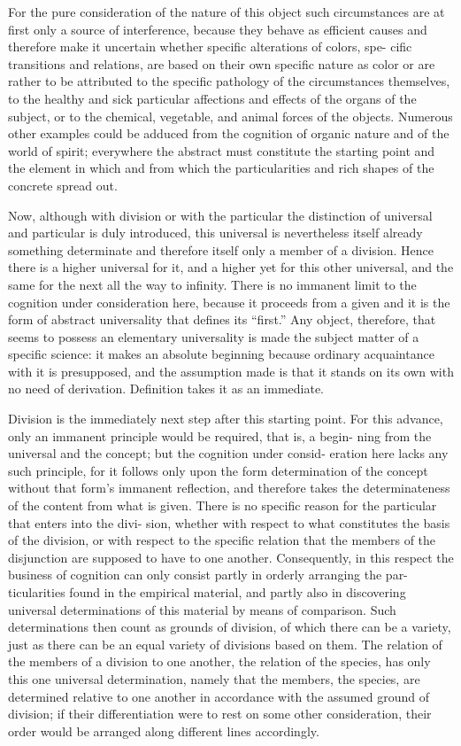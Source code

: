 For the pure consideration of the nature of this object such circumstances are
at first only a source of interference, because they behave as efficient causes
and therefore make it uncertain whether specific alterations of colors, spe-
cific transitions and relations, are based on their own specific nature as color
or are rather to be attributed to the specific pathology of the circumstances
themselves,
 to the healthy and sick particular affections and effects of the
organs of the subject,
or to the chemical, vegetable,
and animal forces of the objects.
Numerous other examples could be adduced from the cognition
of organic nature and of the world of spirit; everywhere the abstract must
constitute the starting point and the element in which and from which the
particularities and rich shapes of the concrete spread out.

Now, although with division or with the particular the distinction of
universal and particular is duly introduced, this universal is nevertheless
itself already something determinate and therefore itself only a member
of a division. Hence there is a higher universal for it, and a higher yet
for this other universal, and the same for the next all the way to infinity.
There is no immanent limit to the cognition under consideration here,
because it proceeds from a given and it is the form of abstract universality
that defines its “first.” Any object, therefore, that seems to possess an
elementary universality is made the subject matter of a specific science:
it makes an absolute beginning because ordinary acquaintance with it is
presupposed, and the assumption made is that it stands on its own with no
need of derivation. Definition takes it as an immediate.

Division is the immediately next step after this starting point. For this
advance, only an immanent principle would be required, that is, a begin-
ning from the universal and the concept; but the cognition under consid-
eration here lacks any such principle, for it follows only upon the form
determination of the concept without that form's immanent reflection,
and therefore takes the determinateness of the content from what is given.
There is no specific reason for the particular that enters into the divi-
sion, whether with respect to what constitutes the basis of the division, or
with respect to the specific relation that the members of the disjunction
are supposed to have to one another. Consequently, in this respect the
business of cognition can only consist partly in orderly arranging the par-
ticularities found in the empirical material, and partly also in discovering
universal determinations of this material by means of comparison. Such
determinations then count as grounds of division, of which there can be
a variety, just as there can be an equal variety of divisions based on them.
The relation of the members of a division to one another, the relation
of the species, has only this one universal determination, namely that the
members, the species, are determined relative to one another in accordance
with the assumed ground of division; if their differentiation were to rest on
some other consideration, their order would be arranged along different
lines accordingly.

